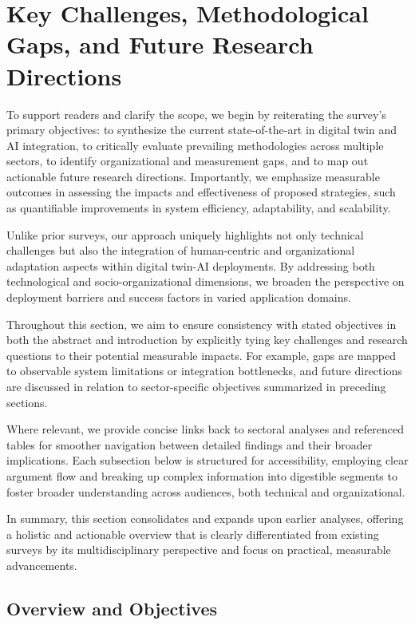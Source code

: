\documentclass[sigconf]{acmart}
\begin{document}
\section{Key Challenges, Methodological Gaps, and Future Research Directions}

To support readers and clarify the scope, we begin by reiterating the survey's primary objectives: to synthesize the current state-of-the-art in digital twin and AI integration, to critically evaluate prevailing methodologies across multiple sectors, to identify organizational and measurement gaps, and to map out actionable future research directions. Importantly, we emphasize measurable outcomes in assessing the impacts and effectiveness of proposed strategies, such as quantifiable improvements in system efficiency, adaptability, and scalability.

Unlike prior surveys, our approach uniquely highlights not only technical challenges but also the integration of human-centric and organizational adaptation aspects within digital twin-AI deployments. By addressing both technological and socio-organizational dimensions, we broaden the perspective on deployment barriers and success factors in varied application domains.

Throughout this section, we aim to ensure consistency with stated objectives in both the abstract and introduction by explicitly tying key challenges and research questions to their potential measurable impacts. For example, gaps are mapped to observable system limitations or integration bottlenecks, and future directions are discussed in relation to sector-specific objectives summarized in preceding sections.

Where relevant, we provide concise links back to sectoral analyses and referenced tables for smoother navigation between detailed findings and their broader implications. Each subsection below is structured for accessibility, employing clear argument flow and breaking up complex information into digestible segments to foster broader understanding across audiences, both technical and organizational.

In summary, this section consolidates and expands upon earlier analyses, offering a holistic and actionable overview that is clearly differentiated from existing surveys by its multidisciplinary perspective and focus on practical, measurable advancements.

\subsection{Overview and Objectives}
\end{document}
